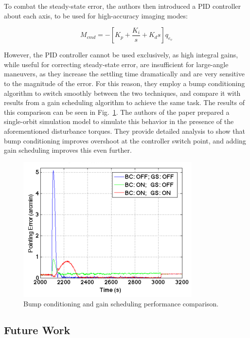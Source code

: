 \documentclass[letterpaper, 11 pt, conference]{ieeeconf}  %
\begin{document}
To combat the steady-state error, the authors then introduced a PID controller about each axis, to be used for high-accuracy imaging modes:

\[
M_{cmd} = - \left[ K_{p} + \frac{K_{i}}{s} + K_{d}s \right] q_{e_{v}}
\]

However, the PID controller cannot be used exclusively, as high integral gains, while useful for correcting steady-state error, are insufficient for large-angle maneuvers, as they increase the settling time dramatically and are very sensitive to the magnitude of the error. For this reason, they employ a bump conditioning algorithm to switch smoothly between the two techniques, and compare it with results from a gain scheduling algorithm to achieve the same task. The results of this comparison can be seen in Fig.~\ref{fig:bc_gs}. The authors of the paper prepared a single-orbit simulation model to simulate this behavior in the presence of the aforementioned disturbance torques. They provide detailed analysis to show that bump conditioning improves overshoot at the controller switch point, and adding gain scheduling improves this even further.

\begin{figure}
  \centering
  \includegraphics[width=\linewidth]{bc_gs}
  \caption{Bump conditioning and gain scheduling performance comparison.}
  \label{fig:bc_gs}
\end{figure}

\subsection{Future Work}
\end{document}
